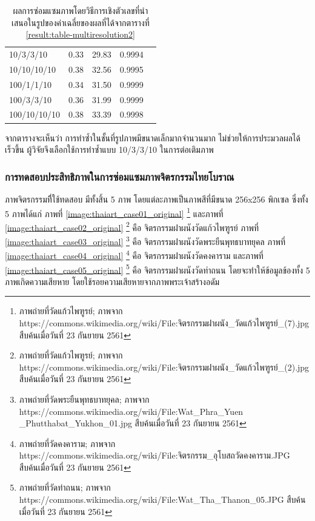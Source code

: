 \documentclass[hidelinks, a4paper,12pt]{article}
\numberwithin{equation}{section}							%
\numberwithin{equation}{section}
\begin{document}
{\begin{table}[H]
\begin{tabular}[ht]{|l|c|c|c|c|}
			10/3/3/10 & 0.33 & 29.83  & 0.9994 \\
			10/10/10/10 & 0.38 & 32.56 & 0.9995 \\
			100/1/1/10 & 0.34 & 31.50 & 0.9999 \\
			100/3/3/10 & 0.36 & 31.99 & 0.9999 \\
			100/10/10/10 & 0.38 & 33.39 & 0.9998 \\
			\hline
		\end{tabular}
		\caption{ผลการซ่อมแซมภาพโดยวิธีการเชิงตัวเลขที่นำเสนอในรูปของค่าเฉลี่ยของผลที่ได้จากตารางที่ \ref{result:table-multiresolution2}}
		\label{result:table-multiresolution2-summary}
	\end{table}	

	\hspace{1cm}จากตารางจะเห็นว่า การทำซ้ำในชั้นที่รูปภาพมีขนาดเล็กมากจำนวนมาก ไม่ช่วยให้การประมวลผลได้เร็วขึ้น ผู้วิจัยจึงเลือกใช้การทำซ้ำแบบ 10/3/3/10 ในการต่อเติมภาพ
	
	\subsubsection{การทดสอบประสิทธิภาพในการซ่อมแซมภาพจิตรกรรมไทยโบราณ}
	\hspace{1cm}ภาพจิตรกรรมทีี่ใช้ทดสอบ มีทั้งสิ้น 5  ภาพ โดยแต่ละภาพเป็นภาพสีที่มีขนาด 256x256 พิกเซล ซึ่งทั้ง 5 ภาพได้แก่ ภาพที่ \ref{image:thaiart_case01_original} \footnote{ภาพถ่ายที่วัดแก้วไพฑูรย์; ภาพจาก  https://commons.wikimedia.org/wiki/File:จิตรกรรมฝาผนัง\_วัดแก้วไพฑูรย์\_(7).jpg สืบค้นเมื่อวันที่ 23 กันยายน 2561}   และภาพที่ \ref{image:thaiart_case02_original} \footnote{ภาพถ่ายที่วัดแก้วไพฑูรย์; ภาพจาก  https://commons.wikimedia.org/wiki/File:จิตรกรรมฝาผนัง\_วัดแก้วไพฑูรย์\_(2).jpg สืบค้นเมื่อวันที่ 23 กันยายน 2561} คือ จิตรกรรมฝาผนังวัดแก้วไพฑูรย์ ภาพที่ \ref{image:thaiart_case03_original} \footnote{ภาพถ่ายที่วัดพระยืนพุทธบาทยุคล; ภาพจาก https://commons.wikimedia.org/wiki/File:Wat\_Phra\_Yuen \_Phutthabat\_Yukhon\_01.jpg สืบค้นเมื่อวันที่ 23 กันยายน 2561}  คือ จิตรกรรมฝาผนังวัดพระยืนพุทธบาทยุคล ภาพที่ \ref{image:thaiart_case04_original} \footnote{ภาพถ่ายที่วัดคงคาราม; ภาพจาก  https://commons.wikimedia.org/wiki/File:จิตรกรรม\_อุโบสถวัดคงคาราม.JPG สืบค้นเมื่อวันที่ 23 กันยายน 2561} คือ จิตรกรรมฝาผนังวัดคงคาราม และภาพที่ \ref{image:thaiart_case05_original} \footnote{ภาพถ่ายที่วัดท่าถนน; ภาพจาก  https://commons.wikimedia.org/wiki/File:Wat\_Tha\_Thanon\_05.JPG สืบค้นเมื่อวันที่ 23 กันยายน 2561} คือ จิตรกรรมฝาผนังวัดท่าถนน
	โดยจะทำให้ข้อมูลข้องทั้ง 5 ภาพเกิดความเสียหาย โดยใช้รอยความเสียหายจากภาพพระเจ้าสร้างอดัม
	
}
\end{document}
